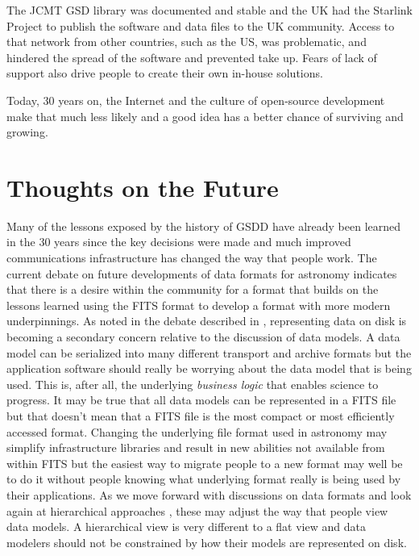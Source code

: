 \documentclass[final,authoryear,5p,times,twocolumn]{elsarticle}
\begin{document}
The JCMT GSD library was documented and stable and the UK had the
Starlink Project \citep{1982QJRAS..23..485D} to publish the software
and data files to the UK community. Access to that network from other
countries, such as the US, was problematic, and hindered the spread of
the software and prevented take up. Fears of lack of support also
drive people to create their own in-house solutions.

Today, 30 years on, the Internet and the culture of open-source
development make that much less likely and a good idea has a better
chance of surviving and growing.

\section{Thoughts on the Future}

Many of the lessons exposed by the history of GSDD have already been
learned in the 30 years since the key decisions were made and much
improved communications infrastructure has changed the way that people
work.  The current debate on future developments of data formats for
astronomy \citep[see e.g.][]{2015Thomas,2015Mink,2015MinkADASS}
indicates that there is a desire within the community for a format
that builds on the lessons learned using the FITS format to develop a
format with more modern underpinnings.  As noted in the debate
described in \citet{2015MinkADASS}, representing data on disk is
becoming a secondary concern relative to the discussion of data
models. A data model can be serialized into many different transport
and archive formats but the application software should really be
worrying about the data model that is being used. This is, after all,
the underlying \emph{business logic} that enables science to progress.
It may be true that all data models can be represented in a FITS file
but that doesn't mean that a FITS file is the most compact or most
efficiently accessed format. Changing the underlying file format used
in astronomy may simplify infrastructure libraries and result in new
abilities not available from within FITS but the easiest way to
migrate people to a new format may well be to do it without people
knowing what underlying format really is being used by their
applications.  As we move forward with discussions on data formats and
look again at hierarchical approaches
\citep[e.g.][]{2015Price,2015HDS,2015ASDF}, these may adjust the way
that people view data models. A hierarchical view is very different to
a flat view and data modelers should not be constrained by how their
models are represented on disk.
\end{document}
